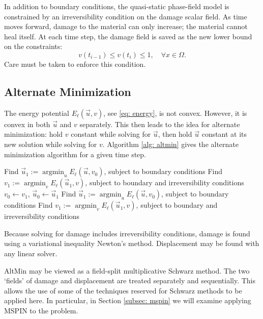 \documentclass{article}
\DeclareMathOperator{\argmin}{argmin}
\numberwithin{equation}{section}
\begin{document}
In addition to boundary conditions, the quasi-static phase-field model is constrained by an irreversibility condition on the damage scalar field.
As time moves forward, damage to the material can only increase; the material cannot heal itself.
At each time step, the damage field is saved as the new lower bound on the constraints:
\begin{equation*}
	v(t_{i-1}) \leq v(t_i) \leq 1, \quad \forall x \in \Omega.
\end{equation*}
Care must be taken to enforce this condition.

\subsection{Alternate Minimization}
\label{subsec: altmin}

The energy potential $E_\ell(\vec{u},v)$, see \eqref{eq: energy}, is not convex.
However, it is convex in both $\vec{u}$ and $v$ separately.
This then leads to the idea for alternate minimization: hold $v$ constant while solving for $\vec{u}$, then hold $\vec{u}$ constant at its new solution while solving for $v$.
Algorithm \ref{alg: altmin} gives the alternate minimization algorithm for a given time step.
\begin{algorithm}
	\caption{AltMin \\
		$\vec{u}_0$: initial displacement, $v_0$: initial damage, $\tau$: tolerance}
	\begin{algorithmic}[1]
	\State Find $\vec{u}_1 := \argmin_u E_\ell(\vec{u}, v_0)$, subject to boundary conditions
	\State Find $v_1 := \argmin_v E_\ell(\vec{u}_1, v)$, subject to boundary and irreversibility conditions
		\State $v_0 \gets v_1$, $\vec{u}_0 \gets \vec{u}_1$
		\State Find $\vec{u}_1 := \argmin_u E_\ell(\vec{u}, v_0)$, subject to boundary conditions
		\State Find $v_1 := \argmin_v E_\ell(\vec{u}_1, v)$, subject to boundary and irreversibility conditions
	\EndWhile
	\end{algorithmic}
	\label{alg: altmin}
\end{algorithm}
Because solving for damage includes irreversibility conditions, damage is found using a variational inequality Newton's method.
Displacement may be found with any linear solver.

AltMin may be viewed as a field-split multiplicative Schwarz method.
The two `fields' of damage and displacement are treated separately and sequentially.
This allows the use of some of the techniques reserved for Schwarz methods to be applied here.
In particular, in Section \ref{subsec: mspin} we will examine applying MSPIN to the problem.
\end{document}
